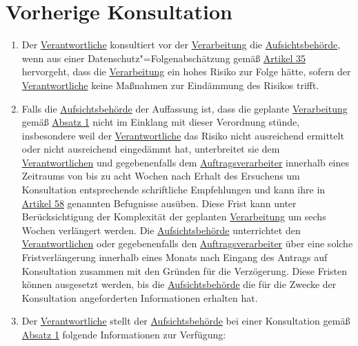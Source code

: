 \chapter{Vorherige Konsultation}
\label{ch:36}


\begin{enumerate}

  \item Der \hyperref[itm:04-7]{Verantwortliche} konsultiert vor der \hyperref[itm:04-2]{Verarbeitung} die \hyperref
   [itm:04-21]{Aufsichtsbehörde}, wenn aus einer Datenschutz"=Folgenabschätzung gemäß \hyperref[ch:35]{Artikel 35}
   hervorgeht, dass die \hyperref[itm:04-2]{Verarbeitung} ein hohes Risiko zur Folge hätte, sofern der \hyperref
   [itm:04-7]{Verantwortliche} keine Maßnahmen zur Eindämmung des Risikos trifft.%
  \label{itm:36-1}

  \item Falls die \hyperref[itm:04-21]{Aufsichtsbehörde} der Auffassung ist, dass die geplante \hyperref[itm:04-2]
   {Verarbeitung} gemäß \hyperref[itm:36-1]{Absatz 1} nicht im Einklang mit dieser Verordnung stünde, insbesondere weil
   der \hyperref[itm:04-7]{Verantwortliche} das Risiko nicht ausreichend ermittelt oder nicht ausreichend eingedämmt
   hat, unterbreitet sie dem \hyperref[itm:04-7]{Verantwortlichen} und gegebenenfalls dem \hyperref[itm:04-8]
   {Auftragsverarbeiter} innerhalb eines Zeitraums von bis zu acht Wochen nach Erhalt des Ersuchens um Konsultation
   entsprechende schriftliche Empfehlungen und kann ihre in \hyperref[ch:58]{Artikel 58} genannten Befugnisse ausüben.
   Diese Frist kann unter Berücksichtigung der Komplexität der geplanten \hyperref[itm:04-2]{Verarbeitung} um sechs
   Wochen verlängert werden. Die \hyperref[itm:04-21]{Aufsichtsbehörde} unterrichtet den \hyperref[itm:04-7]
   {Verantwortlichen} oder gegebenenfalls den
   \hyperref[itm:04-8]{Auftragsverarbeiter} über eine solche Fristverlängerung innerhalb eines Monats nach Eingang des
    Antrags auf Konsultation zusammen mit den Gründen für die Verzögerung. Diese Fristen können ausgesetzt werden, bis
    die
   \hyperref[itm:04-21]{Aufsichtsbehörde} die für die Zwecke der Konsultation angeforderten Informationen erhalten hat.%
  \label{itm:36-2}

  \item Der \hyperref[itm:04-7]{Verantwortliche} stellt der \hyperref[itm:04-21]{Aufsichtsbehörde} bei einer
   Konsultation gemäß \hyperref[itm:36-1]{Absatz 1} folgende Informationen zur Verfügung:%
  \label{itm:36-3}


\end{enumerate}
